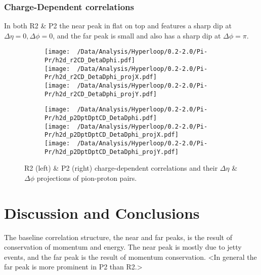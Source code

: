 \documentclass[12pt,a4paper,twoside]{report}
\begin{document}
\subsection{Charge-Dependent correlations}
In both R2 \& P2 the near peak in flat on top and features a sharp dip at $\Delta\eta=0,\Delta\phi=0$, and the far peak is small and also has a sharp dip at $\Delta\phi=\pi$.
\begin{figure}[H]
	\begin{subfigure}{0.49\linewidth}
		\texttt{[image: ~/Data/Analysis/Hyperloop/0.2-2.0/Pi-Pr/h2d\_r2CD\_DetaDphi.pdf]}\\
		\texttt{[image: ~/Data/Analysis/Hyperloop/0.2-2.0/Pi-Pr/h2d\_r2CD\_DetaDphi\_projX.pdf]}\\
		\texttt{[image: ~/Data/Analysis/Hyperloop/0.2-2.0/Pi-Pr/h2d\_r2CD\_DetaDphi\_projY.pdf]}\\
	\end{subfigure}
	\begin{subfigure}{0.49\linewidth}
		\texttt{[image: ~/Data/Analysis/Hyperloop/0.2-2.0/Pi-Pr/h2d\_p2DptDptCD\_DetaDphi.pdf]}\\
		\texttt{[image: ~/Data/Analysis/Hyperloop/0.2-2.0/Pi-Pr/h2d\_p2DptDptCD\_DetaDphi\_projX.pdf]}\\
		\texttt{[image: ~/Data/Analysis/Hyperloop/0.2-2.0/Pi-Pr/h2d\_p2DptDptCD\_DetaDphi\_projY.pdf]}\\
	\end{subfigure}
	\caption{R2 (left) \& P2 (right) charge-dependent correlations and their $\Delta\eta$ \& $\Delta\phi$ projections of pion-proton pairs.}
\end{figure}
\chapter{Discussion and Conclusions}\label{Ch:Conclusions}
The baseline correlation structure, the near and far peaks, is the result of conservation of momentum and energy. The near peak is mostly due to jetty events, and the far peak is the result of momentum conservation.
<In general the far peak is more prominent in P2 than R2.>


\end{document}

